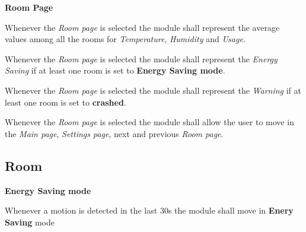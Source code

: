 \begin{req_enum}
\begin{req_enum}[label*=\arabic*.]
				\item \textbf{Room Page}
					\begin{req_enum}[label*=\arabic*.]
						\item Whenever the \textit{Room page} is selected the module shall represent the average values among all the rooms for \textit{Temperature}, \textit{Humidity} and \textit{Usage}.\\
						\item Whenever the \textit{Room page} is selected the module shall represent the \textit{Energy Saving} if at least one room is set to \textbf{Energy Saving mode}.\\
						\item Whenever the \textit{Room page} is selected the module shall represent the \textit{Warning} if at least one room is set to \textbf{crashed}.\\
						\item Whenever the \textit{Room page} is selected the module shall allow the user to move in the \textit{Main page}, \textit{Settings page}, next and previous \textit{Room page}.\\
					\end{req_enum}
			\end{req_enum}
		\end{req_enum}


	\subsection{Room}
		\begin{req_enum}
			\item \textbf{Energy Saving mode}
			\begin{req_enum}[label*=\arabic*.]
				\item Whenever a motion is detected in the last 30s the module shall move in \textbf{Enery Saving} mode
			\end{req_enum}
		\end{req_enum}